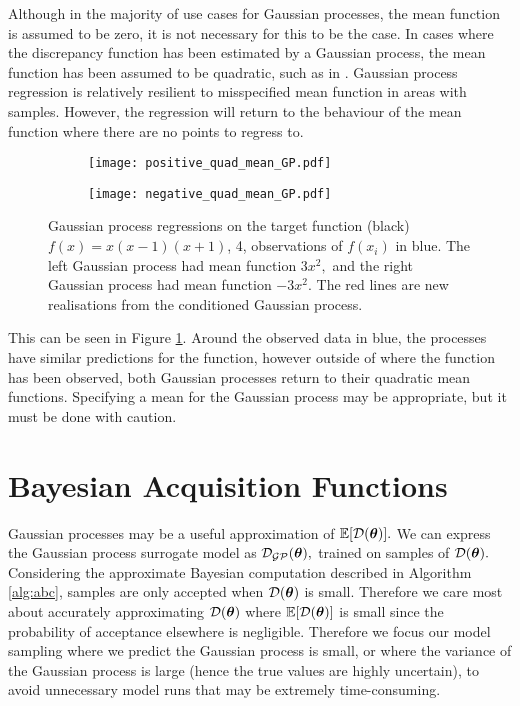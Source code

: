 Although in the majority of use cases for Gaussian processes, the mean function
is assumed to be zero, it is not necessary for this to be the case. In cases
where the discrepancy function has been estimated by a Gaussian process,
the mean function has been assumed to be quadratic, such as in
\parencite{gutmann_bayesian_2016}. Gaussian process regression is relatively
resilient to misspecified mean function in areas with samples. 
However, the regression will return to
the behaviour of the mean function where there are no points to regress to.

\begin{figure}[htbp]
    \centering
    \begin{subfigure}[b]{0.5\textwidth}
        \centering
        \texttt{[image: positive\_quad\_mean\_GP.pdf]}
    \end{subfigure}%
    \hfill%
    \begin{subfigure}[b]{0.5\textwidth}
        \centering
        \texttt{[image: negative\_quad\_mean\_GP.pdf]}
    \end{subfigure}
    \caption[
        The effect of the mean function on Gaussian processes
    ]{Gaussian process regressions on the target function (black) 
    $f(x) = x(x -1)(x+1)$, 4, observations of $f(x_i)$ in blue. The left
    Gaussian process had mean function $3x^2,$ and the right Gaussian process
    had mean function $-3x^2.$
    The red lines are new realisations from the conditioned Gaussian process.}
    \label{fig:means}
\end{figure}

This can be seen in Figure \ref{fig:means}. Around the observed data in blue,
the processes have similar predictions for the function, however
outside of where the function has
been observed, both
Gaussian processes return to their quadratic mean functions.
Specifying a mean for the Gaussian process may be appropriate, but it must
be done with caution.

\section{Bayesian Acquisition Functions}

Gaussian processes may be a useful approximation of $\operatorname{\mathbb{E}}[\mathcal{D}(\bm{\theta})].$ We can
express the Gaussian process surrogate model as $\mathcal{D}_{\mathcal{GP}}(\bm{\theta}),$ trained on
samples of $\mathcal{D}(\bm{\theta}).$
Considering the approximate Bayesian computation described in
Algorithm \ref{alg:abc}, samples are only accepted when $\mathcal{D}(\bm{\theta})$ is small.
Therefore we care most about accurately approximating $\mathcal{D}(\bm{\theta})$ where
$\operatorname{\mathbb{E}}[\mathcal{D}(\bm{\theta})]$ is small since the probability of acceptance elsewhere is
negligible. Therefore we focus our model sampling where we predict the Gaussian
process is small, or where the variance of the Gaussian process is large
(hence the true values are highly uncertain), to avoid unnecessary model runs
that may be extremely time-consuming.

